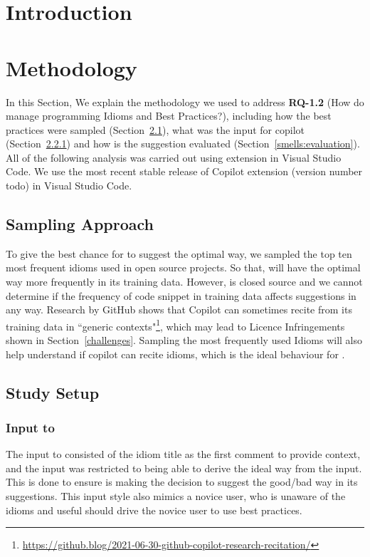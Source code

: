 \label{chapter:smells}

\section{Introduction}


\section{Methodology}
\label{smells:methodology}
In this Section, We explain the methodology we used to address \textbf{RQ-1.2} (How do \cct{} manage programming Idioms and Best Practices?), including how the best practices were sampled (Section~\ref{smells:sampling}), what was the input for copilot (Section~\ref{smells:input}) and how is the suggestion evaluated (Section~\ref{smells:evaluation}). All of the following analysis was carried out using \cop{} extension in Visual Studio Code. We use the most recent stable release of Copilot extension (version number todo) in Visual Studio Code.

\subsection{Sampling Approach}
\label{smells:sampling}
To give the best chance for \cop{} to suggest the optimal way, we sampled the top ten most frequent idioms used in open source projects. So that, \cop{} will have the optimal way more frequently in its training data. However, \cop{} is closed source and we cannot determine if the frequency of code snippet in training data affects \cop{} suggestions in any way. Research by GitHub shows that Copilot can sometimes recite from its training data in ``generic contexts"\footnote{\url{https://github.blog/2021-06-30-github-copilot-research-recitation/}}, which may lead to Licence Infringements shown in Section~\ref{challenges}. Sampling the most frequently used Idioms will also help understand if copilot can recite idioms, which is the ideal behaviour for \cct{}.

\subsection{Study Setup}

\subsubsection{Input to \cop{}}
\label{smells:input}
The input to \cop{} consisted of the idiom title as the first comment to provide context, and the input was restricted to being able to derive the ideal way from the input. This is done to ensure \cop{} is making the decision to suggest the good/bad way in its suggestions. This input style also mimics a novice user, who is unaware of the idioms and useful \cct{} should drive the novice user to use best practices.

